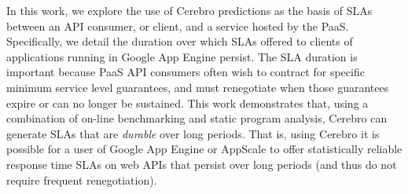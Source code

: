 In this work, we
explore the use of Cerebro predictions as the basis of SLAs between an API
consumer, or client,
and a service hosted by the PaaS.  Specifically, we detail the duration
over which SLAs offered to clients of applications running in Google App
Engine persist. The SLA duration is important because PaaS API consumers
often
wish to contract for specific minimum service level guarantees, and must
renegotiate when those guarantees expire or can no longer be sustained.  
This work demonstrates that, using a combination of on-line benchmarking
and static program analysis, Cerebro can generate SLAs that are
\textit{durable} over long periods.  That is, using Cerebro it is possible for
a user of Google App Engine or AppScale to offer statistically
reliable response time SLAs on web APIs
that persist over long periods (and thus do not require frequent
renegotiation).


